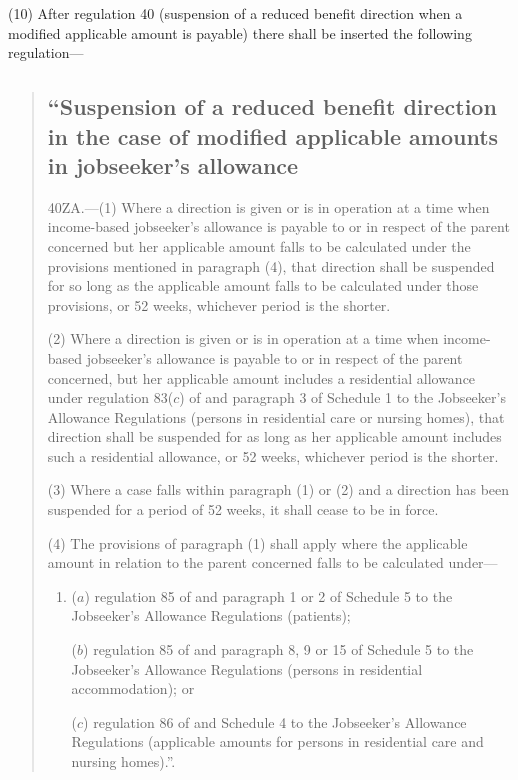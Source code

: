 \documentclass[a4paper]{article}
\begin{document}
(10) After regulation 40 (suspension of a reduced benefit direction when a modified applicable amount is payable) there shall be inserted the following regulation—
\begin{quotation}
\subsection*{\sloppy “Suspension of a reduced benefit direction in the case of modified applicable amounts in jobseeker’s allowance}

40ZA.—(1) Where a direction is given or is in operation at a time when income-based jobseeker’s allowance is payable to or in respect of the parent concerned but her applicable amount falls to be calculated under the provisions mentioned in paragraph (4), that direction shall be suspended for so long as the applicable amount falls to be calculated under those provisions, or 52 weeks, whichever period is the shorter.

(2) Where a direction is given or is in operation at a time when income-based jobseeker’s allowance is payable to or in respect of the parent concerned, but her applicable amount includes a residential allowance under regulation 83($c$) of and paragraph 3 of Schedule 1 to the Jobseeker’s Allowance Regulations (persons in residential care or nursing homes), that direction shall be suspended for as long as her applicable amount includes such a residential allowance, or 52 weeks, whichever period is the shorter.

(3) Where a case falls within paragraph (1) or (2) and a direction has been suspended for a period of 52 weeks, it shall cease to be in force.

(4) The provisions of paragraph (1) shall apply where the applicable amount in relation to the parent concerned falls to be calculated under—
\begin{enumerate}\item[]
($a$) regulation 85 of and paragraph 1 or 2 of Schedule 5 to the Jobseeker’s Allowance Regulations (patients);

($b$) regulation 85 of and paragraph 8, 9 or 15 of Schedule 5 to the Jobseeker’s Allowance Regulations (persons in residential accommodation); or

($c$) regulation 86 of and Schedule 4 to the Jobseeker’s Allowance Regulations (applicable amounts for persons in residential care and nursing homes).”.
\end{enumerate}
\end{quotation}
\end{document}
